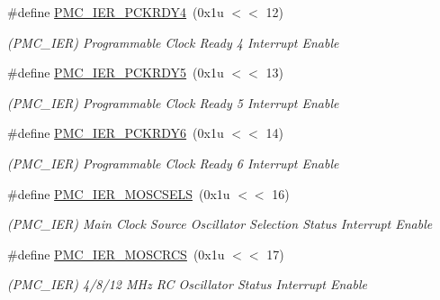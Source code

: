 \begin{DoxyCompactItemize}
\#define \mbox{\hyperlink{group__SAMV71__PMC_ga31be9f0cda08e0f5d90c39f9a45e3401}{P\+M\+C\+\_\+\+I\+E\+R\+\_\+\+P\+C\+K\+R\+D\+Y4}}~(0x1u $<$$<$ 12)
\begin{DoxyCompactList}\small\item\em (P\+M\+C\+\_\+\+I\+ER) Programmable Clock Ready 4 Interrupt Enable \end{DoxyCompactList}\item 
\mbox{\label{group__SAMV71__PMC_gafabc6471c503bf8f0a248d24663a7025}} 
\#define \mbox{\hyperlink{group__SAMV71__PMC_gafabc6471c503bf8f0a248d24663a7025}{P\+M\+C\+\_\+\+I\+E\+R\+\_\+\+P\+C\+K\+R\+D\+Y5}}~(0x1u $<$$<$ 13)
\begin{DoxyCompactList}\small\item\em (P\+M\+C\+\_\+\+I\+ER) Programmable Clock Ready 5 Interrupt Enable \end{DoxyCompactList}\item 
\mbox{\label{group__SAMV71__PMC_ga7c5d0e3f5c33aee7b1daad878b63e145}} 
\#define \mbox{\hyperlink{group__SAMV71__PMC_ga7c5d0e3f5c33aee7b1daad878b63e145}{P\+M\+C\+\_\+\+I\+E\+R\+\_\+\+P\+C\+K\+R\+D\+Y6}}~(0x1u $<$$<$ 14)
\begin{DoxyCompactList}\small\item\em (P\+M\+C\+\_\+\+I\+ER) Programmable Clock Ready 6 Interrupt Enable \end{DoxyCompactList}\item 
\mbox{\label{group__SAMV71__PMC_ga49fddd4922d096f93940f1315798b2f0}} 
\#define \mbox{\hyperlink{group__SAMV71__PMC_ga49fddd4922d096f93940f1315798b2f0}{P\+M\+C\+\_\+\+I\+E\+R\+\_\+\+M\+O\+S\+C\+S\+E\+LS}}~(0x1u $<$$<$ 16)
\begin{DoxyCompactList}\small\item\em (P\+M\+C\+\_\+\+I\+ER) Main Clock Source Oscillator Selection Status Interrupt Enable \end{DoxyCompactList}\item 
\mbox{\label{group__SAMV71__PMC_ga7be59432ed75edc559d72c9c76105086}} 
\#define \mbox{\hyperlink{group__SAMV71__PMC_ga7be59432ed75edc559d72c9c76105086}{P\+M\+C\+\_\+\+I\+E\+R\+\_\+\+M\+O\+S\+C\+R\+CS}}~(0x1u $<$$<$ 17)
\begin{DoxyCompactList}\small\item\em (P\+M\+C\+\_\+\+I\+ER) 4/8/12 M\+Hz RC Oscillator Status Interrupt Enable \end{DoxyCompactList}\item 
$$
\end{DoxyCompactItemize}

